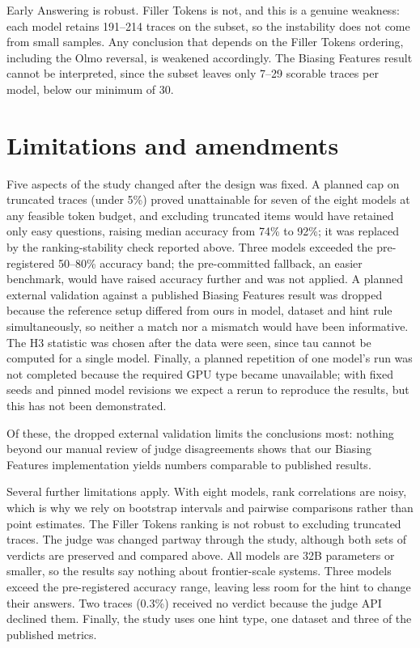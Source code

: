 \documentclass[11pt]{article}
\begin{document}
Early Answering is robust. Filler Tokens is not, and this is a genuine weakness: each model
retains 191--214 traces on the subset, so the instability does not come from small samples. Any
conclusion that depends on the Filler Tokens ordering, including the Olmo reversal, is weakened
accordingly. The Biasing Features result cannot be interpreted, since the subset leaves only
7--29 scorable traces per model, below our minimum of 30.

\section{Limitations and amendments}

Five aspects of the study changed after the design was fixed. A planned cap on truncated traces
(under 5\%) proved unattainable for seven of the eight models at any feasible token budget, and
excluding truncated items would have retained only easy questions, raising median accuracy from
74\% to 92\%; it was replaced by the ranking-stability check reported above. Three models
exceeded the pre-registered 50--80\% accuracy band; the pre-committed fallback, an easier
benchmark, would have raised accuracy further and was not applied. A planned external
validation against a published Biasing Features result was dropped because the reference setup
differed from ours in model, dataset and hint rule simultaneously, so neither a match nor a
mismatch would have been informative. The H3 statistic was chosen after the data were seen,
since tau cannot be computed for a single model. Finally, a planned repetition of one model's
run was not completed because the required GPU type became unavailable; with fixed seeds and
pinned model revisions we expect a rerun to reproduce the results, but this has not been
demonstrated.

Of these, the dropped external validation limits the conclusions most: nothing beyond our
manual review of judge disagreements shows that our Biasing Features implementation yields
numbers comparable to published results.

Several further limitations apply. With eight models, rank correlations are noisy, which is why
we rely on bootstrap intervals and pairwise comparisons rather than point estimates. The Filler
Tokens ranking is not robust to excluding truncated traces. The judge was changed partway
through the study, although both sets of verdicts are preserved and compared above. All models
are 32B parameters or smaller, so the results say nothing about frontier-scale systems. Three
models exceed the pre-registered accuracy range, leaving less room for the hint to change their
answers. Two traces (0.3\%) received no verdict because the judge API declined them. Finally,
the study uses one hint type, one dataset and three of the published metrics.
\end{document}
